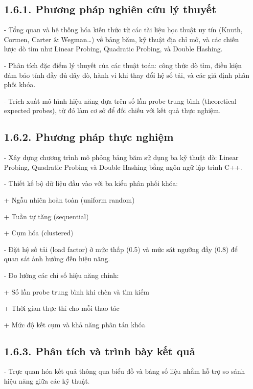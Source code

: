 \documentclass[12pt,a4paper]{report}
\begin{document}
\subsection*{1.6.1. Phương pháp nghiên cứu lý thuyết}
    \noindent \indent- Tổng quan và hệ thống hóa kiến thức từ các tài liệu học thuật uy tín (Knuth, Cormen, Carter \& Wegman…) về bảng băm, kỹ thuật địa chỉ mở, và các chiến lược dò tìm như Linear Probing, Quadratic Probing, và Double Hashing.
    
    - Phân tích đặc điểm lý thuyết của các thuật toán: công thức dò tìm, điều kiện đảm bảo tính đầy đủ dãy dò, hành vi khi thay đổi hệ số tải, và các giả định phân phối khóa.
    
    - Trích xuất mô hình hiệu năng dựa trên số lần probe trung bình (theoretical expected probes), từ đó làm cơ sở để đối chiếu với kết quả thực nghiệm.

\subsection*{1.6.2. Phương pháp thực nghiệm}
    \noindent \indent - Xây dựng chương trình mô phỏng bảng băm sử dụng ba kỹ thuật dò: Linear Probing, Quadratic Probing và Double Hashing bằng ngôn ngữ lập trình C++.
    
    - Thiết kế bộ dữ liệu đầu vào với ba kiểu phân phối khóa:
    
        \hspace{1cm}+ Ngẫu nhiên hoàn toàn (uniform random)
        
       \hspace{1cm}+ Tuần tự tăng (sequential)
       
        \hspace{1cm}+ Cụm hóa (clustered)
 
    - Đặt hệ số tải (load factor) ở mức thấp (0.5) và mức sát ngưỡng đầy (0.8) để quan sát ảnh hưởng đến hiệu năng.
    
    - Đo lường các chỉ số hiệu năng chính:

       \hspace{1cm}+ Số lần probe trung bình khi chèn và tìm kiếm
        
        \hspace{1cm}+ Thời gian thực thi cho mỗi thao tác
        
        \hspace{1cm}+ Mức độ kết cụm và khả năng phân tán khóa

\subsection*{1.6.3. Phân tích và trình bày kết quả}
    \noindent \indent - Trực quan hóa kết quả thông qua biểu đồ và bảng số liệu nhằm hỗ trợ so sánh hiệu năng giữa các kỹ thuật.
    
\end{document}

